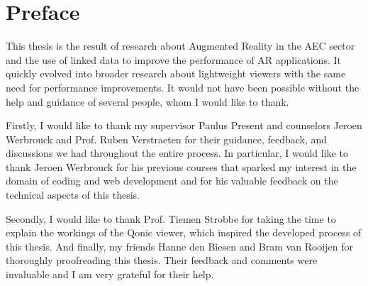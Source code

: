 \chapter*{Preface}
This thesis is the result of research about Augmented Reality in the AEC sector and the use of linked data to improve the performance of AR applications. It quickly evolved into broader research about lightweight viewers with the same need for performance improvements. It would not have been possible without the help and guidance of several people, whom I would like to thank.

Firstly, I would like to thank my supervisor Paulus Present and counselors Jeroen Werbrouck and Prof. Ruben Verstraeten for their guidance, feedback, and discussions we had throughout the entire process. In particular, I would like to thank Jeroen Werbrouck for his previous courses that sparked my interest in the domain of coding and web development and for his valuable feedback on the technical aspects of this thesis.

Secondly, I would like to thank Prof. Tiemen Strobbe for taking the time to explain the workings of the Qonic viewer, which inspired the developed process of this thesis. And finally, my friends Hanne den Biesen and Bram van Rooijen for thoroughly proofreading this thesis. Their feedback and comments were invaluable and I am very grateful for their help.